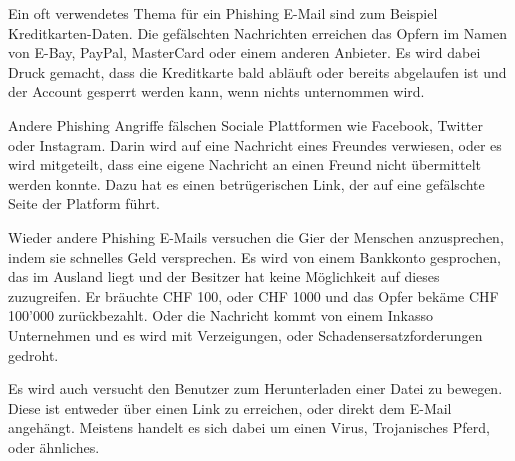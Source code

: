 Ein oft verwendetes Thema für ein Phishing E-Mail sind zum Beispiel Kreditkarten-Daten. Die gefälschten Nachrichten erreichen das Opfern im Namen von E-Bay, PayPal, MasterCard oder einem anderen Anbieter. Es wird dabei Druck gemacht, dass die Kreditkarte bald abläuft oder bereits abgelaufen ist und der Account gesperrt werden kann, wenn nichts unternommen wird. 

Andere Phishing Angriffe fälschen Sociale Plattformen wie Facebook, Twitter oder Instagram. Darin wird auf eine Nachricht eines Freundes verwiesen, oder es wird mitgeteilt, dass eine eigene Nachricht an einen Freund nicht übermittelt werden konnte. Dazu hat es einen betrügerischen Link, der auf eine gefälschte Seite der Platform führt.

Wieder andere Phishing E-Mails versuchen die Gier der Menschen anzusprechen, indem sie schnelles Geld versprechen. Es wird von einem Bankkonto gesprochen, das im Ausland liegt und der Besitzer hat keine Möglichkeit auf dieses zuzugreifen. Er bräuchte CHF 100, oder CHF 1000 und das Opfer bekäme CHF 100'000 zurückbezahlt. Oder die Nachricht kommt von einem Inkasso Unternehmen und es wird mit Verzeigungen, oder Schadensersatzforderungen gedroht.

Es wird auch versucht den Benutzer zum Herunterladen einer Datei zu bewegen. Diese ist entweder über einen Link zu erreichen, oder direkt dem E-Mail angehängt. Meistens handelt es sich dabei um einen Virus, Trojanisches Pferd, oder ähnliches. 

